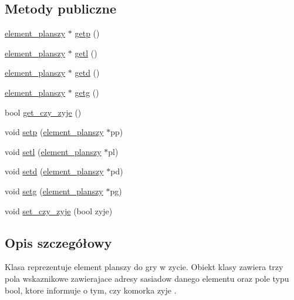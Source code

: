 \subsection*{Metody publiczne}
\begin{DoxyCompactItemize}
\item 
\mbox{\hyperlink{classelement__planszy}{element\+\_\+planszy}} $\ast$ \mbox{\hyperlink{classelement__planszy_a7b72040bbb58d9092a63ed2d0fd18dca}{getp}} ()
\item 
\mbox{\hyperlink{classelement__planszy}{element\+\_\+planszy}} $\ast$ \mbox{\hyperlink{classelement__planszy_a5be5b94cdbbdf68ec426d55789c6579a}{getl}} ()
\item 
\mbox{\hyperlink{classelement__planszy}{element\+\_\+planszy}} $\ast$ \mbox{\hyperlink{classelement__planszy_a7721a78d1a2a879eccfa37b43e5a6be6}{getd}} ()
\item 
\mbox{\hyperlink{classelement__planszy}{element\+\_\+planszy}} $\ast$ \mbox{\hyperlink{classelement__planszy_a4b0995862555562ac47fb3f57da610f8}{getg}} ()
\item 
bool \mbox{\hyperlink{classelement__planszy_affcc7904f806550088b5362691b7953d}{get\+\_\+czy\+\_\+zyje}} ()
\item 
void \mbox{\hyperlink{classelement__planszy_a38094d3cf8ce3543fa3e0720f30583e9}{setp}} (\mbox{\hyperlink{classelement__planszy}{element\+\_\+planszy}} $\ast$pp)
\item 
void \mbox{\hyperlink{classelement__planszy_a9e89f466ff2fe27b7796d84e3967599c}{setl}} (\mbox{\hyperlink{classelement__planszy}{element\+\_\+planszy}} $\ast$pl)
\item 
void \mbox{\hyperlink{classelement__planszy_a6f76a013512cd1d2e3f9c1785217c58d}{setd}} (\mbox{\hyperlink{classelement__planszy}{element\+\_\+planszy}} $\ast$pd)
\item 
void \mbox{\hyperlink{classelement__planszy_a77643f3091a8ee85206c4afc9b27c0c2}{setg}} (\mbox{\hyperlink{classelement__planszy}{element\+\_\+planszy}} $\ast$pg)
\item 
void \mbox{\hyperlink{classelement__planszy_a0b46a16355fcb3123ad3d1a889de5e1f}{set\+\_\+czy\+\_\+zyje}} (bool zyje)
\end{DoxyCompactItemize}


\subsection{Opis szczegółowy}
Klasa reprezentuje element planszy do gry w zycie. Obiekt klasy zawiera trzy pola wskaznikowe zawierajace adresy sasiadow danego elementu oraz pole typu bool, ktore informuje o tym, czy komorka zyje . 

